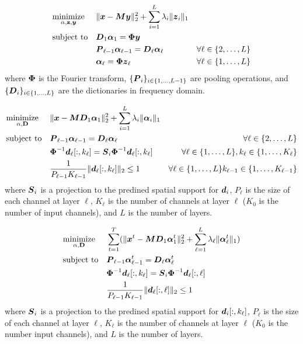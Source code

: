 \documentclass{article}
\begin{document}
\begin{equation}
\begin{aligned}
& \underset{\mathbf{\alpha},\mathbf{z},\boldsymbol{y}}{\text{minimize}}
&& \|\boldsymbol{x} - \boldsymbol{M}\boldsymbol{y}\|_2^2 + \sum_{i = 1}^L \lambda_i \|\boldsymbol{z}_i\|_1 \\
& \text{subject to}
&&  \boldsymbol{D}_1\boldsymbol{\alpha}_1 = \boldsymbol{\Phi}\boldsymbol{y} \\
&&& \boldsymbol{P}_{\ell - 1}\boldsymbol{\alpha}_{\ell - 1} = \boldsymbol{D}_{\ell}\boldsymbol{\alpha}_{\ell} & \forall \ell \in \{2,\hdots,L\}  \\
&&& \boldsymbol{\alpha}_{\ell} = \boldsymbol{\Phi}\boldsymbol{z}_{\ell} & \forall \ell \in \{1,\hdots,L\}
\end{aligned}
\end{equation}
where $\boldsymbol{\Phi}$ is the Fourier transform, $\{\boldsymbol{P}_i\}_{i \in \{1,\hdots,L - 1\}}$ are pooling operations, and $\{\boldsymbol{D}_i\}_{i \in \{1,\hdots,L\}}$ are the dictionaries in frequency domain.

\begin{equation}
\begin{aligned}
& \underset{\mathbf{\alpha},\mathbf{D}}{\text{minimize}}
&& \|\boldsymbol{x} - \boldsymbol{M}\boldsymbol{D}_1\boldsymbol{\alpha}_1\|_2^2 + \sum_{i = 1}^L \lambda_i \|\boldsymbol{\alpha}_i\|_1 \\
& \text{subject to}
&& \boldsymbol{P}_{\ell - 1}\boldsymbol{\alpha}_{\ell - 1} = \boldsymbol{D}_{\ell}\boldsymbol{\alpha}_{\ell} & \forall \ell \in \{2,\hdots,L\}  \\
&&& \boldsymbol{\Phi}^{-1}\boldsymbol{d}_{\ell}[:,k_{\ell}] = \boldsymbol{S}_i\boldsymbol{\Phi}^{-1}\boldsymbol{d}_{\ell}[:,k_{\ell}] & \forall \ell \in \{1,\hdots,L\},k_{\ell} \in \{1,\hdots,K_{\ell}\} \\
&&& \frac{1}{P_{\ell - 1}K_{\ell - 1}}\|\boldsymbol{d}_{\ell}[:,k_{\ell}] \|_2 \leq 1 & \forall \ell \in \{1,\hdots,L\}k_{\ell - 1} \in \{1,\hdots,K_{\ell - 1}\}
\end{aligned}
\end{equation}
where $\boldsymbol{S}_i$ is a projection to the predined spatial support for $\boldsymbol{d}_i$, $P_{\ell}$ is the size of each channel at layer $\ell$, $K_{\ell}$ is the number of channels at layer $\ell$ ($K_0$ is the number of input channels), and $L$ is the number of layers.

\begin{equation}
\begin{aligned}
& \underset{\mathbf{\alpha},\mathbf{D}}{\text{minimize}}
&& \sum_{t = 1}^T (\|\boldsymbol{x}^t - \boldsymbol{M}\boldsymbol{D}_1\boldsymbol{\alpha}_1^t\|_2^2 + \sum_{\ell = 1}^L \lambda_{\ell} \|\boldsymbol{\alpha}_{\ell}^t\|_1) \\
& \text{subject to}
&& \boldsymbol{P}_{\ell - 1}\boldsymbol{\alpha}_{\ell - 1}^t = \boldsymbol{D}_{\ell}\boldsymbol{\alpha}_{\ell}^t   \\
&&& \boldsymbol{\Phi}^{-1}\boldsymbol{d}_{\ell}[:,k_{\ell}] = \boldsymbol{S}_i\boldsymbol{\Phi}^{-1}\boldsymbol{d}_{\ell}[:,\ell]  \\
&&& \frac{1}{P_{\ell - 1}K_{\ell - 1}}\|\boldsymbol{d}_{\ell}[:,\ell] \|_2 \leq 1
\end{aligned}
\end{equation}
where $\boldsymbol{S}_i$ is a projection to the predined spatial support for $\boldsymbol{d}_i[:,k_{\ell}]$, $P_{\ell}$ is the size of each channel at layer $\ell$, $K_{\ell}$ is the number of channels at layer $\ell$ ($K_0$ is the number input channels), and $L$ is the number of layers.
\end{document}
